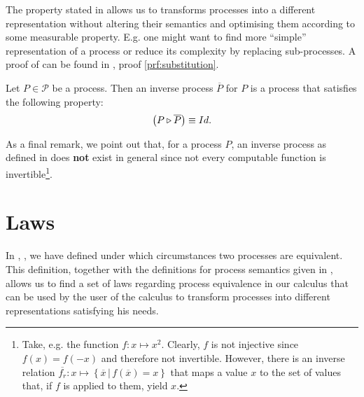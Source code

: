 The property stated in  allows us to transforms processes into a different representation without altering their semantics and optimising them according to some measurable property. E.g. one might want to find more \enquote{simple} representation of a process or reduce its complexity by replacing sub-processes. A proof of  can be found in , proof \ref{prf:substitution}.

\begin{definition}
\label{def:inverse_process}
Let $P \in \mathcal{P}$ be a process. Then an inverse process $\overline{P}$ for $P$ is a process that satisfies the following property:
  \begin{equation*}
    \left( P \triangleright \overline{P} \right) \equiv Id.
  \end{equation*}
  \hfill\qedsymbol
\end{definition}



As a final remark, we point out that, for a process $P$, an inverse process as defined in  does \textbf{not} exist in general since not every computable function is invertible\footnote{Take, e.g. the function $f \colon x \mapsto x^2$. Clearly, $f$ is not injective since $f \left( x \right) = f \left( -x \right)$ and therefore not invertible. However, there is an inverse relation $\overline{f_r} \colon x \mapsto \left\{ \overline{x} \,|\, f \left( \overline{x} \right) = x \right\}$ that maps a value $x$ to the set of values that, if $f$ is applied to them, yield $x$.}.



\clearpage
\section{Laws}
\label{chp:laws}
In , , we have defined under which circumstances two processes are equivalent. This definition, together with the definitions for process semantics given in , allows us to find a set of laws regarding process equivalence in our calculus that can be used by the user of the calculus to transform processes into different representations satisfying his needs.

